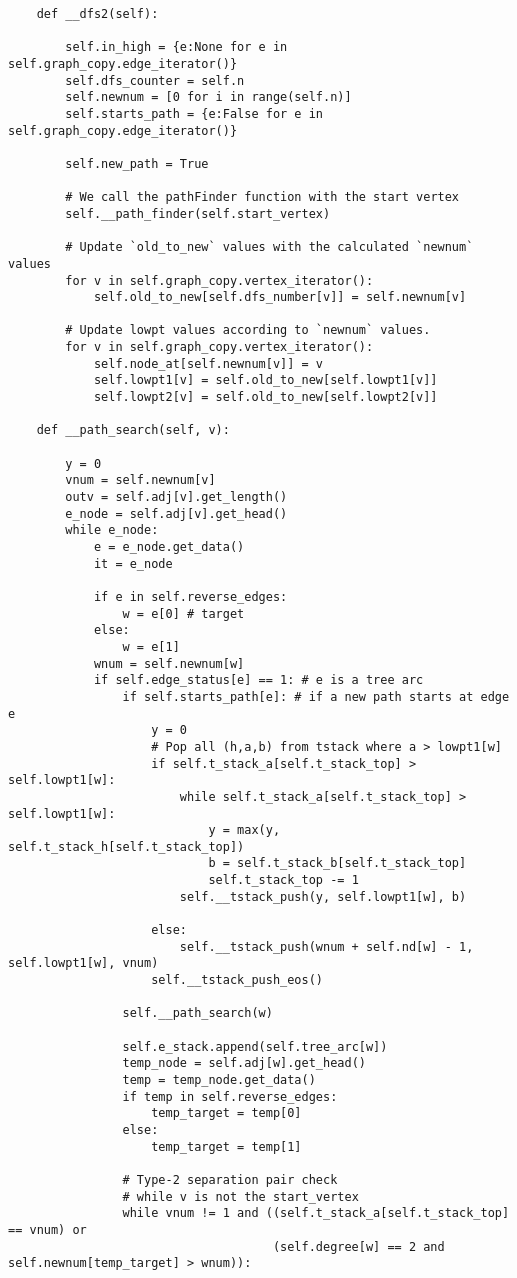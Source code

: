 \begin{center}
\begin{verbatim}
	def __dfs2(self):

		self.in_high = {e:None for e in self.graph_copy.edge_iterator()}
		self.dfs_counter = self.n
		self.newnum = [0 for i in range(self.n)]
		self.starts_path = {e:False for e in self.graph_copy.edge_iterator()}

		self.new_path = True

		# We call the pathFinder function with the start vertex
		self.__path_finder(self.start_vertex)

		# Update `old_to_new` values with the calculated `newnum` values
		for v in self.graph_copy.vertex_iterator():
			self.old_to_new[self.dfs_number[v]] = self.newnum[v]

		# Update lowpt values according to `newnum` values.
		for v in self.graph_copy.vertex_iterator():
			self.node_at[self.newnum[v]] = v
			self.lowpt1[v] = self.old_to_new[self.lowpt1[v]]
			self.lowpt2[v] = self.old_to_new[self.lowpt2[v]]

	def __path_search(self, v):

		y = 0
		vnum = self.newnum[v]
		outv = self.adj[v].get_length()
		e_node = self.adj[v].get_head()
		while e_node:
			e = e_node.get_data()
			it = e_node

			if e in self.reverse_edges:
				w = e[0] # target
			else:
				w = e[1]
			wnum = self.newnum[w]
			if self.edge_status[e] == 1: # e is a tree arc
				if self.starts_path[e]: # if a new path starts at edge e
					y = 0
					# Pop all (h,a,b) from tstack where a > lowpt1[w]
					if self.t_stack_a[self.t_stack_top] > self.lowpt1[w]:
						while self.t_stack_a[self.t_stack_top] > self.lowpt1[w]:
							y = max(y, self.t_stack_h[self.t_stack_top])
							b = self.t_stack_b[self.t_stack_top]
							self.t_stack_top -= 1
						self.__tstack_push(y, self.lowpt1[w], b)

					else:
						self.__tstack_push(wnum + self.nd[w] - 1, self.lowpt1[w], vnum)
					self.__tstack_push_eos()

				self.__path_search(w)

				self.e_stack.append(self.tree_arc[w])
				temp_node = self.adj[w].get_head()
				temp = temp_node.get_data()
				if temp in self.reverse_edges:
					temp_target = temp[0]
				else:
					temp_target = temp[1]

				# Type-2 separation pair check
				# while v is not the start_vertex
				while vnum != 1 and ((self.t_stack_a[self.t_stack_top] == vnum) or
									 (self.degree[w] == 2 and self.newnum[temp_target] > wnum)):


\end{verbatim}
\end{center}
